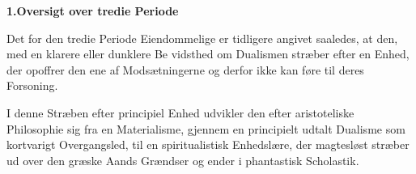 \documentclass[12pt,a4paper]{book}
\begin{document}
\begin{center}
\textbf{1.\enspace Oversigt over tredie Periode}
\end{center}
Det for den tredie Periode Eiendommelige er tidligere
angivet saaledes, at den, med en klarere eller dunklere Be\-%
vidsthed om Dualismen stræber efter en Enhed, der opoffrer
den ene af Modsætningerne og derfor ikke kan føre til deres
Forsoning.

I denne Stræben efter principiel Enhed udvikler den efter\-%
aristoteliske Philosophie sig fra en Materialisme, gjennem en
principielt udtalt Dualisme som kortvarigt Overgangsled, til en
spiritualistisk Enhedslære, der magtesløst stræber ud over den
græske Aands Grændser og ender i phantastisk Scholastik.
\end{document}
